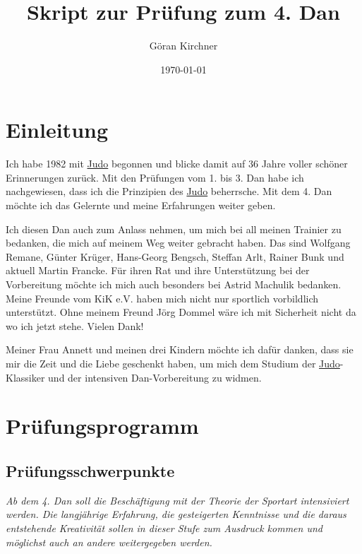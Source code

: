 \documentclass[justified, a4paper, notitlepage, captions=tableheading, nobib]{tufte-handout}
\author{Göran Kirchner}
\date{\today}
\title{Skript zur Prüfung zum 4. Dan}
\begin{document}
\maketitle
\tableofcontents

\ifxetex
  \newcommand{\textls}[2][5]{%
    \begingroup\addfontfeatures{LetterSpace=#1}#2\endgroup
  }
  \renewcommand{\allcapsspacing}[1]{\textls[15]{#1}}
  \renewcommand{\smallcapsspacing}[1]{\textls[10]{#1}}
  \renewcommand{\allcaps}[1]{\textls[15]{\MakeTextUppercase{#1}}}
  \renewcommand{\smallcaps}[1]{\smallcapsspacing{\scshape\MakeTextLowercase{#1}}}
  \renewcommand{\textsc}[1]{\smallcapsspacing{\textsmallcaps{#1}}}
\fi

\newpage
\section{Einleitung}
\label{sec:org794063c}
Ich habe 1982 mit \hyperref[org48a39fa]{Judo} begonnen und blicke damit auf 36 Jahre voller schöner Erinnerungen zurück. 
Mit den Prüfungen vom 1. bis 3. Dan habe ich nachgewiesen, dass ich die Prinzipien des \hyperref[org48a39fa]{Judo} beherrsche. Mit dem 4. Dan möchte ich das Gelernte und meine Erfahrungen weiter geben.

Ich diesen Dan auch zum Anlass nehmen, um mich bei all meinen Trainier zu bedanken, die mich auf meinem Weg weiter gebracht haben. Das sind Wolfgang Remane, Günter Krüger, Hans-Georg Bengsch, Steffan Arlt, Rainer Bunk und aktuell Martin Francke. Für ihren Rat und ihre Unterstützung bei der Vorbereitung möchte ich mich auch besonders bei Astrid Machulik bedanken. Meine Freunde vom KiK e.V. haben mich nicht nur sportlich vorbildlich unterstützt. Ohne meinem Freund Jörg Dommel wäre ich mit Sicherheit nicht da wo ich jetzt stehe. Vielen Dank!

Meiner Frau Annett und meinen drei Kindern möchte ich dafür danken, dass sie mir die Zeit und die Liebe geschenkt haben, um mich dem Studium der \hyperref[org48a39fa]{Judo}-Klassiker und der intensiven Dan-Vorbereitung zu widmen.

\newpage
\section{Prüfungsprogramm}
\label{sec:org2aeed25}
\subsection{Prüfungsschwerpunkte}
\label{sec:orgb74d777}
\emph{Ab dem 4. Dan soll die Beschäftigung mit der Theorie der Sportart intensiviert werden.
Die langjährige Erfahrung, die gesteigerten Kenntnisse und die daraus entstehende Kreativität sollen in dieser Stufe zum Ausdruck kommen und möglichst auch an andere weitergegeben werden.}
\end{document}
